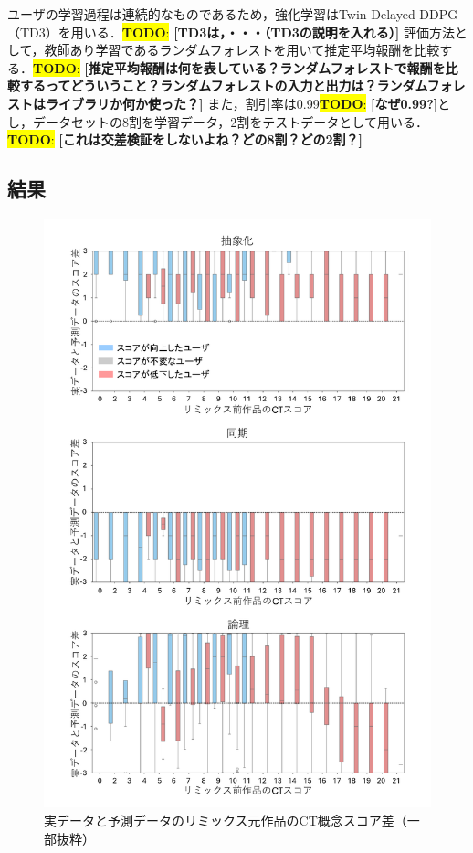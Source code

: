 \documentclass[submit,techrep,noauthor]{ipsj}
\newcommand{\todo}[1]{\colorbox{yellow}{{\bf TODO}:}{\color{red} {\textbf{[#1]}}}}
\begin{document}
ユーザの学習過程は連続的なものであるため，強化学習はTwin Delayed DDPG（TD3）を用いる．\todo{TD3は，・・・（TD3の説明を入れる）}
評価方法として，教師あり学習であるランダムフォレストを用いて推定平均報酬を比較する．\todo{推定平均報酬は何を表している？ランダムフォレストで報酬を比較するってどういうこと？ランダムフォレストの入力と出力は？ランダムフォレストはライブラリか何か使った？}
また，割引率は0.99\todo{なぜ0.99?}とし，データセットの8割を学習データ，2割をテストデータとして用いる．\todo{これは交差検証をしないよね？どの8割？どの2割？}

\subsection{結果}

\begin{figure}[h]
  \centering
  \includegraphics[width=\linewidth]{@IPSJ_SIGSE202511_Horio/fig/diffmini.pdf}
  \caption{実データと予測データのリミックス元作品のCT概念スコア差（一部抜粋）}
  \label{diffminigraph}
\end{figure}
\end{document}
